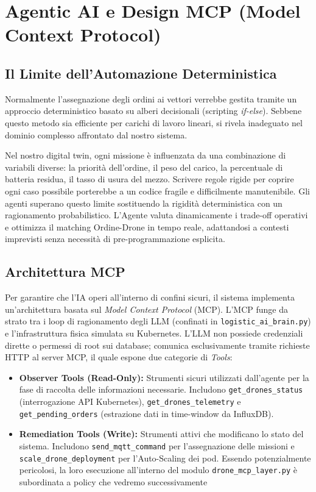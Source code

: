 
\chapter{Agentic AI e Design MCP (Model Context Protocol)}
\label{cap:agentic_operations_mcp}

\section{Il Limite dell'Automazione Deterministica}
\label{sec:limite_automazione}

Normalmente l'assegnazione degli ordini ai vettori verrebbe gestita tramite un approccio deterministico basato su alberi decisionali (scripting \textit{if-else}). Sebbene questo metodo sia efficiente per carichi di lavoro lineari, si rivela inadeguato nel dominio complesso affrontato dal nostro sistema. 

Nel nostro digital twin, ogni missione è influenzata da una combinazione di variabili diverse: la priorità dell'ordine, il peso del carico, la percentuale di batteria residua, il tasso di usura del mezzo. Scrivere regole rigide per coprire ogni caso possibile porterebbe a un codice fragile e difficilmente manutenibile. 
Gli agenti superano questo limite sostituendo la rigidità deterministica con un ragionamento probabilistico. L'Agente valuta dinamicamente i trade-off operativi e ottimizza il matching Ordine-Drone in tempo reale, adattandosi a contesti imprevisti senza necessità di pre-programmazione esplicita.

\section{Architettura MCP}
\label{sec:architettura_mcp}
Per garantire che l'IA operi all'interno di confini sicuri, il sistema implementa un'architettura basata sul \textit{Model Context Protocol} (MCP). L'MCP funge da strato tra i loop di ragionamento degli LLM (confinati in \texttt{logistic\_ai\_brain.py}) e l'infrastruttura fisica simulata su Kubernetes. 
L'LLM non possiede credenziali dirette o permessi di root sui database; comunica esclusivamente tramite richieste HTTP al server MCP, il quale espone due categorie di \textit{Tools}:

\begin{itemize}
    \item \textbf{Observer Tools (Read-Only):} Strumenti sicuri utilizzati dall'agente per la fase di raccolta delle informazioni necessarie. Includono \texttt{get\_drones\_status} (interrogazione API Kubernetes), \texttt{get\_drones\_telemetry} e \texttt{get\_pending\_orders} (estrazione dati in time-window da InfluxDB).
    \item \textbf{Remediation Tools (Write):} Strumenti attivi che modificano lo stato del sistema. Includono \texttt{send\_mqtt\_command} per l'assegnazione delle missioni e \texttt{scale\_drone\_deployment} per l'Auto-Scaling dei pod. Essendo potenzialmente pericolosi, la loro esecuzione all'interno del modulo \texttt{drone\_mcp\_layer.py} è subordinata a policy che vedremo successivamente
\end{itemize}

